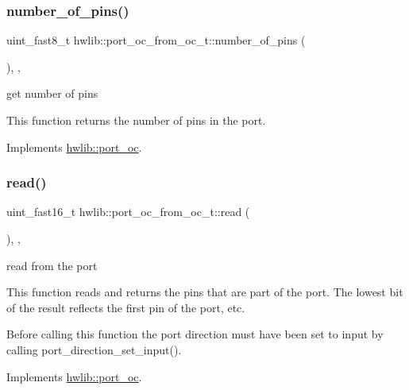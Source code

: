 \subsubsection{\texorpdfstring{number\+\_\+of\+\_\+pins()}{number\_of\_pins()}}
{\footnotesize\ttfamily uint\+\_\+fast8\+\_\+t hwlib\+::port\+\_\+oc\+\_\+from\+\_\+oc\+\_\+t\+::number\+\_\+of\+\_\+pins (\begin{DoxyParamCaption}{ }\end{DoxyParamCaption})\hspace{0.3cm}{\ttfamily [inline]}, {\ttfamily [override]}, {\ttfamily [virtual]}}





get number of pins

This function returns the number of pins in the port. 

Implements \hyperlink{classhwlib_1_1port__oc_a44d0dbfde290ad17237ad70c09a4c402}{hwlib\+::port\+\_\+oc}.

\mbox{\label{classhwlib_1_1port__oc__from__oc__t_a4b5416b414d012a6b8954ae4924253d3}} 
\subsubsection{\texorpdfstring{read()}{read()}}
{\footnotesize\ttfamily uint\+\_\+fast16\+\_\+t hwlib\+::port\+\_\+oc\+\_\+from\+\_\+oc\+\_\+t\+::read (\begin{DoxyParamCaption}{ }\end{DoxyParamCaption})\hspace{0.3cm}{\ttfamily [inline]}, {\ttfamily [override]}, {\ttfamily [virtual]}}





read from the port

This function reads and returns the pins that are part of the port. The lowest bit of the result reflects the first pin of the port, etc.

Before calling this function the port direction must have been set to input by calling port\+\_\+direction\+\_\+set\+\_\+input(). 

Implements \hyperlink{classhwlib_1_1port__oc_a422b02326f14332df44863adced18427}{hwlib\+::port\+\_\+oc}.

